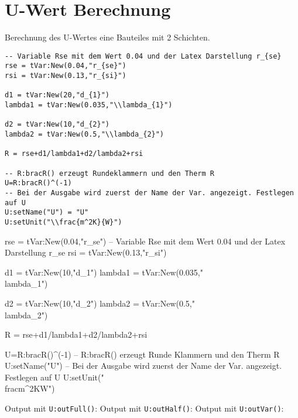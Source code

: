 \section{U-Wert Berechnung}
Berechnung des U-Wertes eine Bauteiles mit 2 Schichten.
\begin{lstlisting}
-- Variable Rse mit dem Wert 0.04 und der Latex Darstellung r_{se}
rse = tVar:New(0.04,"r_{se}")
rsi = tVar:New(0.13,"r_{si}")

d1 = tVar:New(20,"d_{1}")
lambda1 = tVar:New(0.035,"\\lambda_{1}")

d2 = tVar:New(10,"d_{2}")
lambda2 = tVar:New(0.5,"\\lambda_{2}")

R = rse+d1/lambda1+d2/lambda2+rsi

-- R:bracR() erzeugt Rundeklammern und den Therm R
U=R:bracR()^(-1)
-- Bei der Ausgabe wird zuerst der Name der Var. angezeigt. Festlegen auf U
U:setName("U") = "U"
U:setUnit("\\frac{m^2K}{W}")
\end{lstlisting}
\begin{luacode*}
	rse = tVar:New(0.04,"r_{se}") -- Variable Rse mit dem Wert 0.04 und der Latex Darstellung r_{se}
	rsi = tVar:New(0.13,"r_{si}")

	d1 = tVar:New(10,"d_{1}")
	lambda1 = tVar:New(0.035,"\\lambda_{1}")

	d2 = tVar:New(10,"d_{2}")
	lambda2 = tVar:New(0.5,"\\lambda_{2}")

	R = rse+d1/lambda1+d2/lambda2+rsi

	U=R:bracR()^(-1) -- R:bracR() erzeugt Runde Klammern und den Therm R
	U:setName("U") -- Bei der Ausgabe wird zuerst der Name der Var. angezeigt. Festlegen auf U
	U:setUnit("\\frac{m^2K}{W}")
\end{luacode*}
Output mit \lstinline{U:outFull()}:
Output mit \lstinline{U:outHalf()}:
Output mit \lstinline{U:outVar()}:
	\newpage
